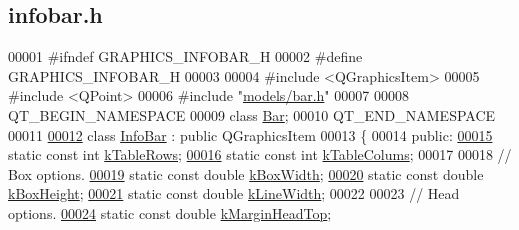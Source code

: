 \hypertarget{infobar_8h_source}{}\subsection{infobar.\+h}
\label{infobar_8h_source}

\begin{DoxyCode}
00001 \textcolor{preprocessor}{#ifndef GRAPHICS\_INFOBAR\_H}
00002 \textcolor{preprocessor}{#define GRAPHICS\_INFOBAR\_H}
00003 
00004 \textcolor{preprocessor}{#include <QGraphicsItem>}
00005 \textcolor{preprocessor}{#include <QPoint>}
00006 \textcolor{preprocessor}{#include "\hyperlink{bar_8h}{models/bar.h}"}
00007 
00008 QT\_BEGIN\_NAMESPACE
00009 \textcolor{keyword}{class }\hyperlink{class_bar}{Bar};
00010 QT\_END\_NAMESPACE
00011 
\hypertarget{infobar_8h_source_l00012}{}\hyperlink{class_info_bar}{00012} \textcolor{keyword}{class }\hyperlink{class_info_bar}{InfoBar} : \textcolor{keyword}{public} QGraphicsItem
00013 \{
00014 \textcolor{keyword}{public}:
\hypertarget{infobar_8h_source_l00015}{}\hyperlink{class_info_bar_ad54d2dd19a63caf9d2476aace60ae3c5}{00015}   \textcolor{keyword}{static} \textcolor{keyword}{const} \textcolor{keywordtype}{int} \hyperlink{class_info_bar_ad54d2dd19a63caf9d2476aace60ae3c5}{kTableRows};
\hypertarget{infobar_8h_source_l00016}{}\hyperlink{class_info_bar_a57e9e7c40a6fd2a56dd47a4512d65489}{00016}   \textcolor{keyword}{static} \textcolor{keyword}{const} \textcolor{keywordtype}{int} \hyperlink{class_info_bar_a57e9e7c40a6fd2a56dd47a4512d65489}{kTableColums};
00017 
00018   \textcolor{comment}{// Box options.}
\hypertarget{infobar_8h_source_l00019}{}\hyperlink{class_info_bar_a58f7773f4265d7e759f2eeb4c9aac48d}{00019}   \textcolor{keyword}{static} \textcolor{keyword}{const} \textcolor{keywordtype}{double} \hyperlink{class_info_bar_a58f7773f4265d7e759f2eeb4c9aac48d}{kBoxWidth};
\hypertarget{infobar_8h_source_l00020}{}\hyperlink{class_info_bar_aedf2e766968ea9ba3e691f24efb8c117}{00020}   \textcolor{keyword}{static} \textcolor{keyword}{const} \textcolor{keywordtype}{double} \hyperlink{class_info_bar_aedf2e766968ea9ba3e691f24efb8c117}{kBoxHeight};
\hypertarget{infobar_8h_source_l00021}{}\hyperlink{class_info_bar_a9592abdb63cc3cfffc6e5826f998a353}{00021}   \textcolor{keyword}{static} \textcolor{keyword}{const} \textcolor{keywordtype}{double} \hyperlink{class_info_bar_a9592abdb63cc3cfffc6e5826f998a353}{kLineWidth};
00022 
00023   \textcolor{comment}{// Head options.}
\hypertarget{infobar_8h_source_l00024}{}\hyperlink{class_info_bar_ae4ec64a4c58d29eb6c7378b4621bc6c2}{00024}   \textcolor{keyword}{static} \textcolor{keyword}{const} \textcolor{keywordtype}{double} \hyperlink{class_info_bar_ae4ec64a4c58d29eb6c7378b4621bc6c2}{kMarginHeadTop};

\end{DoxyCode}
